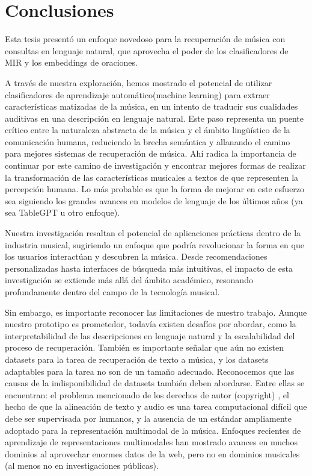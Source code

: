 \chapter*{Conclusiones}
\label{chap:conclusions}
Esta tesis presentó un enfoque novedoso para la recuperación de música con consultas en lenguaje natural, que aprovecha el poder de los clasificadores de MIR y los embeddings de oraciones.

A través de nuestra exploración, hemos mostrado el potencial de utilizar clasificadores de aprendizaje automático(machine learning) para extraer características matizadas de la música, en un intento de traducir sus cualidades auditivas en una descripción en lenguaje natural. Este paso representa un puente crítico entre la naturaleza abstracta de la música y el ámbito lingüístico de la comunicación humana, reduciendo la brecha semántica y allanando el camino para mejores sistemas de recuperación de música. Ahí radica la importancia de continuar por este camino de investigación y encontrar mejores formas de realizar la transformación de las características musicales a textos de que representen la percepción humana. Lo más probable es que la forma de mejorar en este esfuerzo sea siguiendo los grandes avances en modelos de lenguaje de los últimos años (ya sea TableGPT u otro enfoque).

Nuestra investigación resaltan el potencial de aplicaciones prácticas dentro de la industria musical, sugiriendo un enfoque que podría revolucionar la forma en que los usuarios interactúan y descubren la música. Desde recomendaciones personalizadas hasta interfaces de búsqueda más intuitivas, el impacto de esta investigación se extiende más allá del ámbito académico, resonando profundamente dentro del campo de la tecnología musical.

Sin embargo, es importante reconocer las limitaciones de nuestro trabajo. Aunque nuestro prototipo es prometedor, todavía existen desafíos por abordar, como la interpretabilidad de las descripciones en lenguaje natural y la escalabilidad del proceso de recuperación. También es importante señalar que aún no existen datasets para la tarea de recuperación de texto a música, y los datasets adaptables para la tarea no son de un tamaño adecuado. Reconocemos que las causas de la indisponibilidad de datasets también deben abordarse. Entre ellas se encuentran: el problema mencionado de los derechos de autor (copyright) , el hecho de que la alineación de texto y audio es una tarea computacional difícil que debe ser supervisada por humanos, y la ausencia de un estándar ampliamente adoptado para la representación multimodal de la música. Enfoques recientes de aprendizaje de representaciones multimodales han mostrado avances en muchos dominios al aprovechar enormes datos de la web, pero no en dominios musicales (al menos no en investigaciones públicas).


